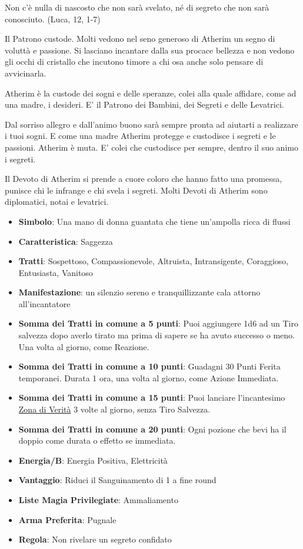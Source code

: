 \begin{multicols}{2}
\begin{changemargin}{0.3cm}{0.3cm}
\begin{enfasi}
{\medskip

Non c'è nulla di nascosto che non sarà svelato, né di segreto che non sarà conosciuto. (Luca, 12, 1-7)
}\end{enfasi}\end{changemargin}\medskip

Il Patrono custode. Molti vedono nel seno generoso di Atherim un segno di voluttà e passione. Si lasciano incantare dalla sua procace bellezza e non vedono gli occhi di cristallo che incutono timore a chi osa anche solo pensare di avvicinarla.

Atherim è la custode dei sogni e delle speranze, colei alla quale affidare, come ad una madre, i desideri. E' il Patrono dei Bambini, dei Segreti e delle Levatrici.

Dal sorriso allegro e dall'animo buono sarà sempre pronta ad aiutarti a realizzare i tuoi sogni. E come una madre Atherim protegge e custodisce i segreti e le passioni. Atherim è muta. E' colei che custodisce per sempre, dentro il suo animo i segreti.

Il Devoto di Atherim si prende a cuore coloro che hanno fatto una promessa, punisce chi le infrange e chi svela i segreti. Molti Devoti di Atherim sono diplomatici, notai e levatrici.

\begin{itemize}[leftmargin=*] \setlength{\itemsep}{0pt}
\item \textbf{Simbolo}: Una mano di donna guantata che tiene un'ampolla ricca di flussi
\item \textbf{Caratteristica}: Saggezza
\item \textbf{Tratti}: Sospettoso, Compassionevole, Altruista, Intransigente, Coraggioso, Entusiasta, Vanitoso
\item \textbf{Manifestazione}: un silenzio sereno e tranquillizzante cala attorno all'incantatore
\item \textbf{Somma dei Tratti in comune a 5 punti}: Puoi aggiungere 1d6 ad un Tiro salvezza dopo averlo tirato ma prima di sapere se ha avuto successo o meno. Una volta al giorno, come Reazione.
\item \textbf{Somma dei Tratti in comune a 10 punti}: Guadagni 30 Punti Ferita temporanei. Durata 1 ora, una volta al giorno, come Azione Immediata.
\item \textbf{Somma dei Tratti in comune a 15 punti}: Puoi lanciare l'incantesimo \hyperlink{Zona di Verità}{Zona di Verità} 3 volte al giorno, senza Tiro Salvezza.
\item \textbf{Somma dei Tratti in comune a 20 punti}: Ogni pozione che bevi ha il doppio come durata o effetto se immediata.
\item \textbf{Energia/B}: Energia Positiva, Elettricità
\item \textbf{Vantaggio}: Riduci il Sanguinamento di 1 a fine round
\item \textbf{Liste Magia Privilegiate}: Ammaliamento
\item \textbf{Arma Preferita}: Pugnale
\item \textbf{Regola}: Non rivelare un segreto confidato
\end{itemize}


\end{multicols}
